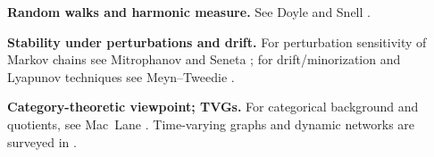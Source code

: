 \documentclass[11pt]{article}
\newcommand{\1}{\mathbf{1}}
\begin{document}
\noindent\textbf{Random walks and harmonic measure.}
See Doyle and Snell \cite{DoyleSnell1984}.
\smallskip

\noindent\textbf{Stability under perturbations and drift.}
For perturbation sensitivity of Markov chains see Mitrophanov \cite{Mitrophanov2005} and Seneta \cite{Seneta1993}; for drift/minorization and Lyapunov techniques see Meyn--Tweedie \cite{MeynTweedie}. %
\smallskip

\noindent\textbf{Category-theoretic viewpoint; TVGs.}
For categorical background and quotients, see Mac~Lane \cite{MacLane1998}. Time-varying graphs and dynamic networks are surveyed in \cite{TVGSurvey}. %



\end{document}
